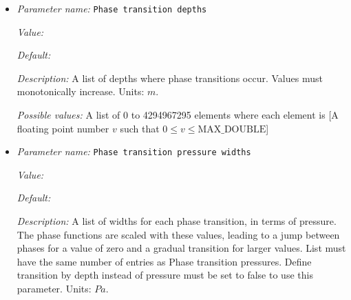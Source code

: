 \begin{itemize}
{\it Value:} 


{\it Default:} 


{\it Description:} A list of density jumps at each phase transition. A positive value means that the density increases with depth. The corresponding entry in Corresponding phase for density jump determines if the density jump occurs in peridotite, eclogite or none of them.List must have the same number of entries as Phase transition depths. Units: $kg/m^3$.


{\it Possible values:} A list of 0 to 4294967295 elements where each element is [A floating point number $v$ such that $0 \leq v \leq \text{MAX\_DOUBLE}$]
\item {\it Parameter name:} {\tt Phase transition depths}
\label{parameters:Material model/Latent heat/Phase transition depths}
\label{parameters:Material_20model/Latent_20heat/Phase_20transition_20depths}


{\it Value:} 


{\it Default:} 


{\it Description:} A list of depths where phase transitions occur. Values must monotonically increase. Units: $m$.


{\it Possible values:} A list of 0 to 4294967295 elements where each element is [A floating point number $v$ such that $0 \leq v \leq \text{MAX\_DOUBLE}$]
\item {\it Parameter name:} {\tt Phase transition pressure widths}
\label{parameters:Material model/Latent heat/Phase transition pressure widths}
\label{parameters:Material_20model/Latent_20heat/Phase_20transition_20pressure_20widths}


{\it Value:} 


{\it Default:} 


{\it Description:} A list of widths for each phase transition, in terms of pressure. The phase functions are scaled with these values, leading to a jump between phases for a value of zero and a gradual transition for larger values. List must have the same number of entries as Phase transition pressures. Define transition by depth instead of pressure must be set to false to use this parameter. Units: $Pa$.



\end{itemize}
